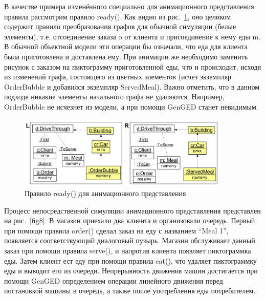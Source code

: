 \documentclass[a5paper]{article}
\begin{document}
В качестве примера изменённого специально для анимационного представления правила рассмотрим правило ready(). Как видно из рис.~\ref{fig7}, оно целиком содержит правило преобразования графов для обычной симуляции (белые элементы), т.е. отсоединение заказа o от клиента и присоединение к нему еды m. В обычной объектной модели эти операции бы означали, что еда для клиента была приготовлена и доставлена ему. При анимации же необходимо заменить рисунок с заказом на пиктограмму приготовленной еды, что и происходит, исходя из изменений графа, состоящего из цветных элементов (исчез экземпляр OrderBubble и добавился экземпляр ServedMeal). Важно отметить, что в данном подходе никакие элементы начального графа не удаляются. Например, OrderBubble не исчезнет из модели, а при помощи GenGED станет невидимым.

\begin{figure} [ht]
  \begin{center}
    \includegraphics[width=0.9\textwidth]{7.png}
    \caption{Правило ready() для анимационного представления}
    \label{fig7}
  \end{center}
\end{figure}

Процесс непосредственной симуляции анимационного представления представлен на рис.~\ref{fig8}. В магазин приехали два клиента и организовали очередь. Первый при помощи правила order() сделал заказ на еду с названием “Meal 1”, появляется соответствующий диалоговый пузырь. Магазин обслуживает данный заказ при помощи правила serve(), и напротив клиента появляет пиктограммка еды. Затем клиент ест еду при помощи правила eat(), что удаляет пиктограммку еды и выводит его из очереди. Непрерывность движения машин достигается при помощи GenGED определением операции линейного движения перед постановкой машины в очередь, а также после употребления еды потребителем.
\end{document}
